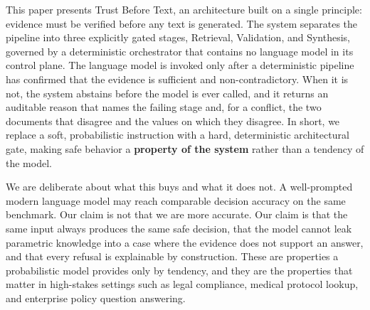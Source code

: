 \documentclass[conference]{IEEEtran}
\begin{document}
This paper presents Trust Before Text, an architecture built on a single
principle: evidence must be verified before any text is generated. The
system separates the pipeline into three explicitly gated stages,
Retrieval, Validation, and Synthesis, governed by a deterministic
orchestrator that contains no language model in its control plane. The
language model is invoked only after a deterministic pipeline has confirmed
that the evidence is sufficient and non-contradictory. When it is not, the
system abstains before the model is ever called, and it returns an
auditable reason that names the failing stage and, for a conflict, the two
documents that disagree and the values on which they disagree. In short, we
replace a soft, probabilistic instruction with a hard, deterministic
architectural gate, making safe behavior a \textbf{property of the system}
rather than a tendency of the model.

We are deliberate about what this buys and what it does not. A well-prompted
modern language model may reach comparable decision accuracy on the same
benchmark. Our claim is not that we are more accurate. Our claim is that the
same input always produces the same safe decision, that the model cannot
leak parametric knowledge into a case where the evidence does not support an
answer, and that every refusal is explainable by construction. These are
properties a probabilistic model provides only by tendency, and they are the
properties that matter in high-stakes settings such as legal compliance,
medical protocol lookup, and enterprise policy question answering.
\end{document}
